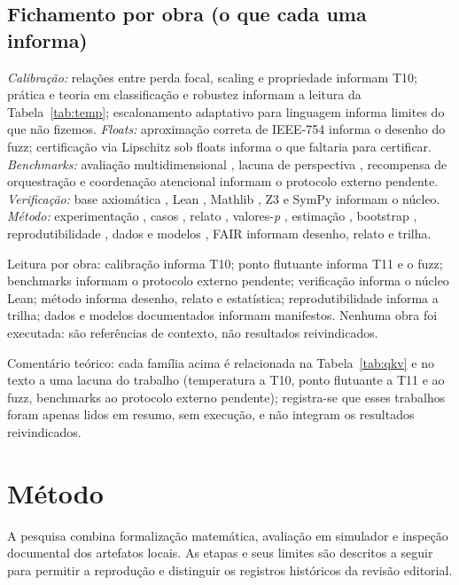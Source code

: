\documentclass[12pt,openany,oneside,a4paper,brazil,chapter=TITLE]{abntex2}
\let\cite\citep
\begin{document}
\section{Fichamento por obra (o que cada uma informa)}
\textit{Calibração:} relações entre perda focal, scaling e propriedade \cite{komisarenko2024} informam T10; prática e teoria em classificação e robustez \cite{xuan2025} informam a leitura da Tabela~\ref{tab:temp}; escalonamento adaptativo para linguagem \cite{xie2024} informa limites do que não fizemos. \textit{Floats:} aproximação correta de IEEE-754 \cite{bagnara2019} informa o desenho do fuzz; certificação via Lipschitz sob floats \cite{murray2026} informa o que faltaria para certificar. \textit{Benchmarks:} avaliação multidimensional \cite{agentbench2023}, lacuna de perspectiva \cite{perspectivegap2026}, recompensa de orquestração \cite{orchrm2026} e coordenação atencional \cite{orchestrator2025} informam o protocolo externo pendente. \textit{Verificação:} base axiomática \cite{hoare1969}, Lean \cite{moura2021}, Mathlib \cite{mathlib2020}, Z3 \cite{demoura2008} e SymPy \cite{meurer2017} informam o núcleo. \textit{Método:} experimentação \cite{basili1986,wohlin2012}, casos \cite{runeson2009}, relato \cite{page2021}, valores-\textit{p} \cite{wasserstein2016}, estimação \cite{cumming2014}, bootstrap \cite{efron1979}, reprodutibilidade \cite{osc2015,collberg2016,ioannidis2005}, dados e modelos \cite{gebru2021,mitchell2019}, FAIR \cite{wilkinson2016} informam desenho, relato e trilha.
\par Leitura por obra: calibração informa T10; ponto flutuante informa T11 e o fuzz; benchmarks informam o protocolo externo pendente; verificação informa o núcleo Lean; método informa desenho, relato e estatística; reprodutibilidade informa a trilha; dados e modelos documentados informam manifestos. Nenhuma obra foi executada: são referências de contexto, não resultados reivindicados.
\par Comentário teórico: cada família acima é relacionada na Tabela~\ref{tab:qkv} e no texto a uma lacuna do trabalho (temperatura a T10, ponto flutuante a T11 e ao fuzz, benchmarks ao protocolo externo pendente); registra-se que esses trabalhos foram apenas lidos em resumo, sem execução, e não integram os resultados reivindicados.



\chapter{Método}\label{cap:metodo}
A pesquisa combina formalização matemática, avaliação em simulador e inspeção documental dos artefatos locais. As etapas e seus limites são descritos a seguir para permitir a reprodução e distinguir os registros históricos da revisão editorial.
\end{document}
